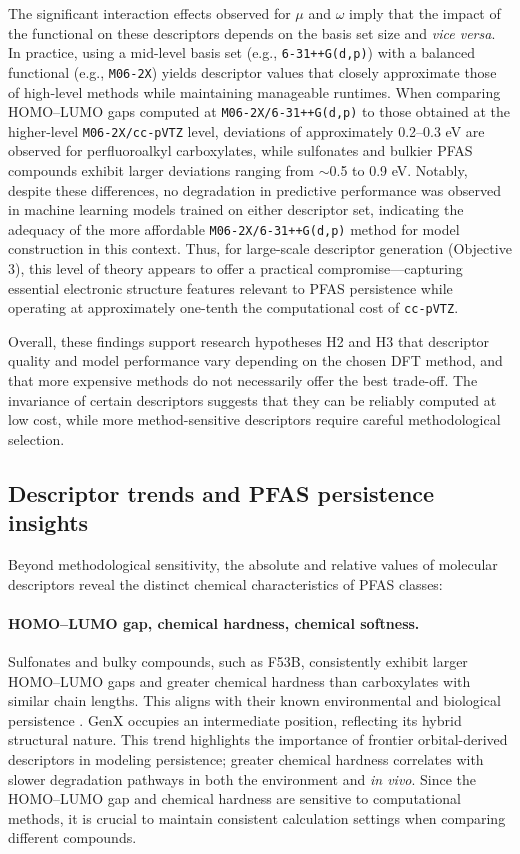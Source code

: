 The significant interaction effects observed for \(\mu\) and \(\omega\) imply that the impact of the functional on these descriptors depends on the basis set size and \textit{vice versa}. In practice, using a mid-level basis set (e.g., \texttt{6-31++G(d,p)}) with a balanced functional (e.g., \texttt{M06-2X}) yields descriptor values that closely approximate those of high-level methods while maintaining manageable runtimes. When comparing HOMO–LUMO gaps computed at \texttt{M06‑2X/6‑31++G(d,p)} to those obtained at the higher-level \texttt{M06‑2X/cc‑pVTZ} level, deviations of approximately 0.2–0.3 eV are observed for perfluoroalkyl carboxylates, while sulfonates and bulkier PFAS compounds exhibit larger deviations ranging from $\sim$0.5 to 0.9 eV. Notably, despite these differences, no degradation in predictive performance was observed in machine learning models trained on either descriptor set, indicating the adequacy of the more affordable \texttt{M06‑2X/6‑31++G(d,p)} method for model construction in this context. Thus, for large-scale descriptor generation (Objective 3), this level of theory appears to offer a practical compromise—capturing essential electronic structure features relevant to PFAS persistence while operating at approximately one-tenth the computational cost of \texttt{cc‑pVTZ}.

Overall, these findings support research hypotheses H2 and H3 that descriptor quality and model performance vary depending on the chosen DFT method, and that more expensive methods do not necessarily offer the best trade-off. The invariance of certain descriptors suggests that they can be reliably computed at low cost, while more method-sensitive descriptors require careful methodological selection.

\subsection{Descriptor trends and PFAS persistence insights}

Beyond methodological sensitivity, the absolute and relative values of molecular descriptors reveal the distinct chemical characteristics of PFAS classes:

\paragraph{HOMO–LUMO gap, chemical hardness, chemical softness.} 
Sulfonates and bulky compounds, such as F53B, consistently exhibit larger HOMO–LUMO gaps and greater chemical hardness than carboxylates with similar chain lengths. This aligns with their known environmental and biological persistence \cite{F53B_worse} \cite{F53B_worse_2}. GenX occupies an intermediate position, reflecting its hybrid structural nature. This trend highlights the importance of frontier orbital-derived descriptors in modeling persistence; greater chemical hardness correlates with slower degradation pathways in both the environment and \textit{in vivo}. Since the HOMO–LUMO gap and chemical hardness are sensitive to computational methods, it is crucial to maintain consistent calculation settings when comparing different compounds.

